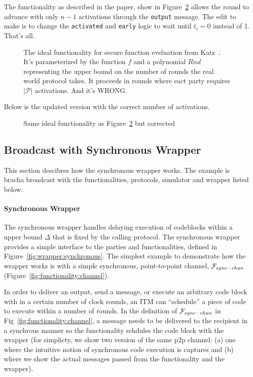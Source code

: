 The functionality as described in the paper, show in Figure~\ref{fig:sfe} allows the round to advance with only $n-1$ activations through the \texttt{output} message.
The edit to make is to change the \texttt{activated} and \texttt{early} logic to wait until $t_i = 0$ instead of 1. That's all.


\begin{figure}
	
	\label{fig:sfe}
	\caption{The ideal functionality for secure function eveluation from Katz~\cite{synchronousuc}. It's parameterized by the function $f$ and a polynomial $Rnd$ representing the upper bound on the number of rounds the real world protocol takes. It proceeds in rounds where eact party requires $|\mathcal{P}|$ activations. And it's WRONG.}
\end{figure}

Below is the updated version with the correct number of activations.

\begin{figure}
	
	\label{fig:sfe}
	\caption{Same ideal functionality as Figure~\ref{fig:sfe} but corrected}
\end{figure}

\begin{figure}
	
	\label{fig:wrapper}
\end{figure}

\newpage

\subsection{Broadcast with Synchronous Wrapper}
This section descibres how the synchronous wrapper works.
The example is bracha broadcast with the functionalities, protocols, simulator and wrapper listed below.

\paragraph{Synchronous Wrapper}
The synchronous wrapper handles delaying execution of codeblocks within a upper bound $\Delta$ that is fixed by the calling protocol. 
The synchronous wrapper provides a simple interface to the parties and functionalities, defined in Figure~\ref{fig:wrapper:synchronous}.
The simplest example to demonstrate how the wrapper works is with a simple synchronous, point-to-point channel, $\mathcal{F}_{sync-chan}$ (Figure~\ref{fig:functionality:channel}).

In order to deliver an output, send a message, or execute an arbitrary code block with in a certain number of clock rounds, an ITM can ``schedule'' a piece of code to execute within a number of rounds.
In the definition of $\mathcal{F}_{sync-chan}$ in Fig~\ref{fig:functionality:channel}, a message needs to be delivered to the recipient in a synchrous manner so the functionality schdules the code block with the wrapper (for simplicty, we show two version of the same p2p channel: (a) one where the intuitive notion of synchronous code execution is captures and (b) where we show the actual messages passed from the functionality and the wrapper). 

